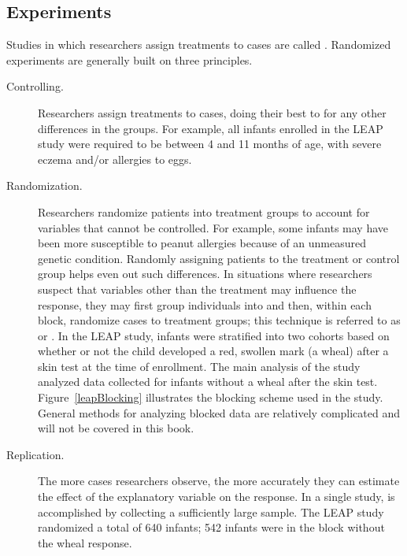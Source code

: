 \begin{doublespace}
\subsection[Experiments]{Experiments}
\label{experiments}

Studies in which researchers assign treatments to cases are called . Randomized experiments are generally built on three principles.


\begin{description}

	\item[Controlling.] Researchers assign treatments to cases, doing their best to  for any other differences in the groups. For example, all infants enrolled in the LEAP study were required to be between 4 and 11 months of age, with severe eczema and/or allergies to eggs.

	\item[Randomization.] Researchers randomize patients into treatment groups to account for variables that cannot be controlled. For example, some infants may have been more susceptible to peanut allergies because of an unmeasured genetic condition. Randomly assigning patients to the treatment or control group helps even out such differences. In situations where researchers suspect that variables other than the treatment may influence the response, they may first group individuals into  and then, within each block, randomize cases to treatment groups; this technique is referred to as  or .  In the LEAP study, infants were stratified into two cohorts based on whether or not the child developed a red, swollen mark (a wheal) after a skin test at the time of enrollment. The main analysis of the study analyzed data collected for infants without a wheal after the skin test. Figure~\ref{leapBlocking} illustrates the blocking scheme used in the study. General methods for analyzing blocked data are relatively complicated and will not be covered in this book.

	\item[Replication.] The more cases researchers observe, the more accurately they can estimate the effect of the explanatory variable on the response. In a single study,  is accomplished by collecting a sufficiently large sample. The LEAP study randomized a total of 640 infants; 542 infants were in the block without the wheal response. 


\end{description}
\end{doublespace}
